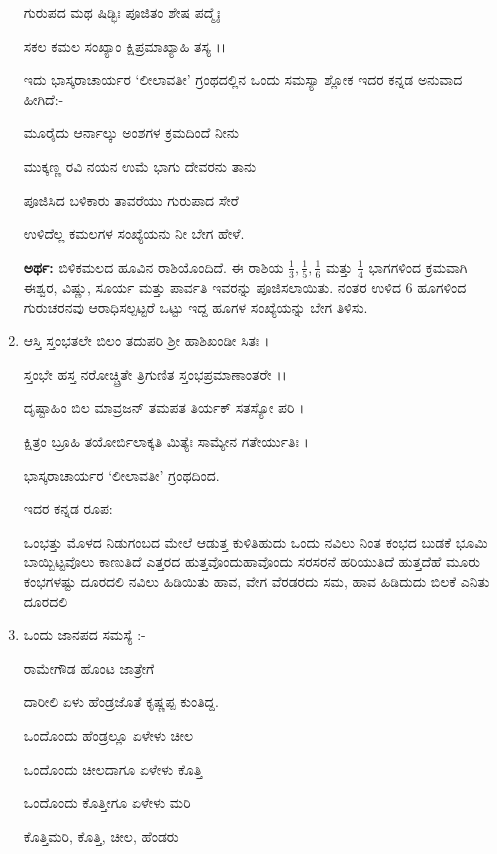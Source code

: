 \begin{enumerate}
 ಗುರುಪದ ಮಥ ಷಿಡ್ಭಿಃ ಪೂಜಿತಂ ಶೇಷ ಪದ್ಮೈಃ 
 
 ಸಕಲ ಕಮಲ ಸಂಖ್ಯಾಂ ಕ್ಷಿಪ್ರಮಾಖ್ಯಾಹಿ ತಸ್ಯ ।।
 
 \medskip
 
 ಇದು ಭಾಸ್ಕರಾಚಾರ್ಯರ ‘ಲೀಲಾವತೀ’ ಗ್ರಂಥದಲ್ಲಿನ ಒಂದು ಸಮಸ್ಯಾ ಶ್ಲೋಕ ಇದರ ಕನ್ನಡ ಅನುವಾದ ಹೀಗಿದೆ:-
 
 \smallskip
 
 ಮೂರೈದು ಆರ್ನಾಲ್ಕು ಅಂಶಗಳ ಕ್ರಮದಿಂದೆ ನೀನು
 
 ಮುಕ್ಕಣ್ಣ ರವಿ ನಯನ ಉಮೆ ಭಾಗು ದೇವರನು ತಾನು 
 
 ಪೂಜಿಸಿದ ಬಳಿಕಾರು ತಾವರೆಯು ಗುರುಪಾದ ಸೇರೆ 
 
 ಉಳಿದೆಲ್ಲ ಕಮಲಗಳ ಸಂಖ್ಯೆಯನು ನೀ ಬೇಗ ಹೇಳೆ.
 
 \smallskip
 {\bf ಅರ್ಥ:} ಬಿಳಿಕಮಲದ ಹೂವಿನ ರಾಶಿಯೊಂದಿದೆ. ಈ ರಾಶಿಯ $\frac{1}{3}, \frac{1}{5}, \frac{1}{6}$ ಮತ್ತು $\frac{1}{4}$ ಭಾಗಗಳಿಂದ ಕ್ರಮವಾಗಿ ಈಶ್ವರ, ವಿಷ್ಣು, ಸೂರ್ಯ ಮತ್ತು ಪಾರ್ವತಿ ಇವರನ್ನು ಪೂಜಿಸಲಾಯಿತು. ನಂತರ ಉಳಿದ 6 ಹೂಗಳಿಂದ ಗುರುಚರನವು ಆರಾಧಿಸಲ್ಪಟ್ಟರೆ ಒಟ್ಟು ಇದ್ದ ಹೂಗಳ ಸಂಖ್ಯೆಯನ್ನು ಬೇಗ ತಿಳಿಸು. 
 
 \eject
 
 \item ಆಸ್ತಿ ಸ್ತಂಭತಲೇ ಬಿಲಂ ತದುಪರಿ ಶ್ರೀ ಹಾಶಿಖಂಡೀ ಸಿತಃ ।
 
 ಸ್ತಂಭೇ ಹಸ್ತ ನರೋಚ್ಚ್ರಿತೇ ತ್ರಿಗುಣಿತ ಸ್ತಂಭಪ್ರಮಾಣಾಂತರೇ ।।
 
 ದೃಷ್ಟಾಹಿಂ ಬಿಲ ಮಾವ್ರಜನ್ ತಮಪತ ತಿರ್ಯಕ್ ಸತಸ್ಯೋ ಪರಿ ।
 
 ಕ್ಷಿತ್ರಂ ಬ್ರೂಹಿ ತಯೋರ್ಬಿಲಾಕ್ಕತಿ ಮಿತ್ಯೆಃ ಸಾಮ್ಯೇನ ಗತೇರ್ಯುತಿಃ ।
 
 \hfill ಭಾಸ್ಕರಾಚಾರ್ಯರ ‘ಲೀಲಾವತೀ’ ಗ್ರಂಥದಿಂದ.
  
 \smallskip
 
 ಇದರ ಕನ್ನಡ ರೂಪ:
 
 \smallskip
 
 ಒಂಭತ್ತು ಮೊಳದ ನಿಡುಗಂಬದ ಮೇಲೆ ಆಡುತ್ತ ಕುಳಿತಿಹುದು ಒಂದು ನವಿಲು ನಿಂತ ಕಂಭದ ಬುಡಕೆ ಭೂಮಿ ಬಾಯ್ಬಿಟ್ಟವೊಲು ಕಾಣುತಿದೆ ಎತ್ತರದ ಹುತ್ತವೊಂದು\break ಹಾವೊಂದು ಸರಸರನೆ ಹರಿಯುತಿದೆ ಹುತ್ತದೆಹೆ ಮೂರು ಕಂಭಗಳಷ್ಟು ದೂರದಲಿ ನವಿಲು ಹಿಡಿಯಿತು ಹಾವ, ವೇಗ ವೆರಡರದು ಸಮ, ಹಾವ ಹಿಡಿದುದು ಬಿಲಕೆ ಎನಿತು ದೂರದಲಿ
 
 \item ಒಂದು ಜಾನಪದ ಸಮಸ್ಯೆ :-
 
\smallskip

ರಾಮೇಗೌಡ ಹೊಂಟ ಜಾತ್ರೇಗೆ 
 
ದಾರೀಲಿ ಏಳು ಹೆಂಡ್ರಜೊತೆ ಕೃಷ್ಣಪ್ಪ ಕುಂತಿದ್ದ. 
 
ಒಂದೊಂದು ಹೆಂಡ್ರಲ್ಲೂ ಏಳೇಳು ಚೀಲ 
 
ಒಂದೊಂದು ಚೀಲದಾಗೂ ಏಳೇಳು ಕೊತ್ತಿ 
 
ಒಂದೊಂದು ಕೊತ್ತೀಗೂ ಏಳೇಳು ಮರಿ

ಕೊತ್ತಿಮರಿ, ಕೊತ್ತಿ, ಚೀಲ, ಹೆಂಡರು 


\end{enumerate}
